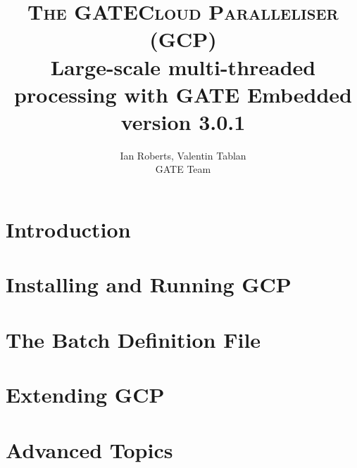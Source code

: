 \documentclass[10pt, a4paper, twoside]{report}
\begin{document}
\title{{\Huge {\textsc{The GATECloud Paralleliser (GCP)}}}\\
Large-scale multi-threaded processing with GATE Embedded \\
{\small version 3.0.1}
}
\author{Ian Roberts, Valentin Tablan\\GATE Team}

\thispagestyle{empty}
\maketitle


\clearpage

\setcounter{tocdepth}{2}
\tableofcontents

\thispagestyle{empty}
\cleardoublepage

\pagestyle{fancy}
\fancyhead{} %

\chapter{Introduction}\label{chap:intro}


\chapter{Installing and Running GCP}\label{chap:install}


\chapter{The Batch Definition File}\label{chap:batch-def}


\chapter{Extending GCP}\label{chap:extending}


\chapter{Advanced Topics}\label{chap:advanced}

\end{document}
